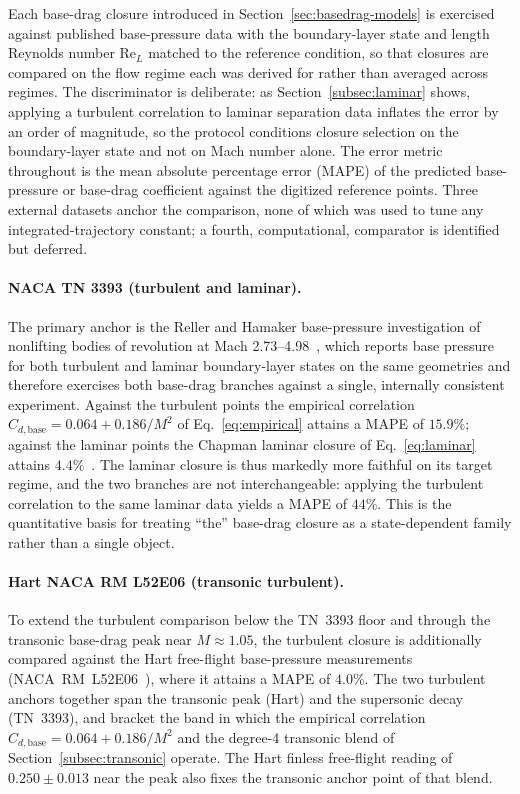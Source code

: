 Each base-drag closure introduced in Section~\ref{sec:basedrag-models} is
exercised against published base-pressure data with the boundary-layer state and
length Reynolds number $\mathrm{Re}_{L}$ matched to the reference condition, so
that closures are compared on the flow regime each was derived for rather than
averaged across regimes. The discriminator is deliberate: as
Section~\ref{subsec:laminar} shows, applying a turbulent correlation to laminar
separation data inflates the error by an order of magnitude, so the protocol
conditions closure selection on the boundary-layer state and not on Mach number
alone. The error metric throughout is the mean absolute percentage error (MAPE)
of the predicted base-pressure or base-drag coefficient against the digitized
reference points. Three external datasets anchor the comparison, none of which
was used to tune any integrated-trajectory constant; a fourth, computational,
comparator is identified but deferred.

\paragraph{NACA TN 3393 (turbulent and laminar).} The primary anchor is the
Reller and Hamaker base-pressure investigation of nonlifting bodies of revolution
at Mach 2.73--4.98~\cite{chapman1955}, which reports base pressure for both
turbulent and laminar boundary-layer states on the same geometries and therefore
exercises both base-drag branches against a single, internally consistent
experiment. Against the turbulent points the empirical correlation
$C_{d,\mathrm{base}} = 0.064 + 0.186/M^{2}$ of Eq.~\eqref{eq:empirical} attains a
MAPE of $15.9\%$; against the laminar points the Chapman laminar closure of
Eq.~\eqref{eq:laminar} attains $4.4\%$~\cite{chapman1955}. The laminar closure is
thus markedly more faithful on its target regime, and the two branches are not
interchangeable: applying the turbulent correlation to the same laminar data
yields a MAPE of $44\%$. This is the quantitative basis for treating ``the''
base-drag closure as a state-dependent family rather than a single object.

\paragraph{Hart NACA RM L52E06 (transonic turbulent).} To extend the turbulent
comparison below the TN~3393 floor and through the transonic base-drag peak near
$M \approx 1.05$, the turbulent closure is additionally compared against the Hart
free-flight base-pressure measurements (NACA~RM~L52E06~\cite{hart1952basedrag}),
where it attains a MAPE of $4.0\%$. The two turbulent anchors together span the transonic
peak (Hart) and the supersonic decay (TN~3393), and bracket the band in which the
empirical correlation $C_{d,\mathrm{base}} = 0.064 + 0.186/M^{2}$ and the degree-4
transonic blend of Section~\ref{subsec:transonic} operate. The Hart finless
free-flight reading of $0.250 \pm 0.013$ near the peak also fixes the transonic
anchor point of that blend.

